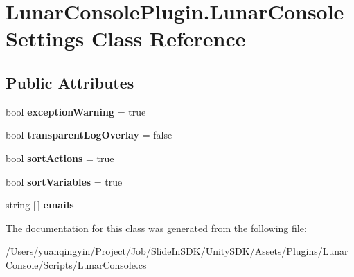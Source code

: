\hypertarget{class_lunar_console_plugin_1_1_lunar_console_settings}{}\section{Lunar\+Console\+Plugin.\+Lunar\+Console\+Settings Class Reference}
\label{class_lunar_console_plugin_1_1_lunar_console_settings}
\subsection*{Public Attributes}
\begin{DoxyCompactItemize}
\item 
\mbox{\label{class_lunar_console_plugin_1_1_lunar_console_settings_a1e98f96861dd9a18646ff2879d80f3e0}} 
bool {\bfseries exception\+Warning} = true
\item 
\mbox{\label{class_lunar_console_plugin_1_1_lunar_console_settings_ad998897d9b3d4bfa66dd49a463fe24fb}} 
bool {\bfseries transparent\+Log\+Overlay} = false
\item 
\mbox{\label{class_lunar_console_plugin_1_1_lunar_console_settings_ae6f16c36169ec0ac5e6fc13d01450a73}} 
bool {\bfseries sort\+Actions} = true
\item 
\mbox{\label{class_lunar_console_plugin_1_1_lunar_console_settings_a8f3748a1958124adf50c228ab68353e0}} 
bool {\bfseries sort\+Variables} = true
\item 
\mbox{\label{class_lunar_console_plugin_1_1_lunar_console_settings_aac3443084e0995a8d7729ed743c94fed}} 
string \mbox{[}$\,$\mbox{]} {\bfseries emails}
\end{DoxyCompactItemize}


The documentation for this class was generated from the following file\+:\begin{DoxyCompactItemize}
\item 
/\+Users/yuanqingyin/\+Project/\+Job/\+Slide\+In\+S\+D\+K/\+Unity\+S\+D\+K/\+Assets/\+Plugins/\+Lunar\+Console/\+Scripts/Lunar\+Console.\+cs\end{DoxyCompactItemize}
